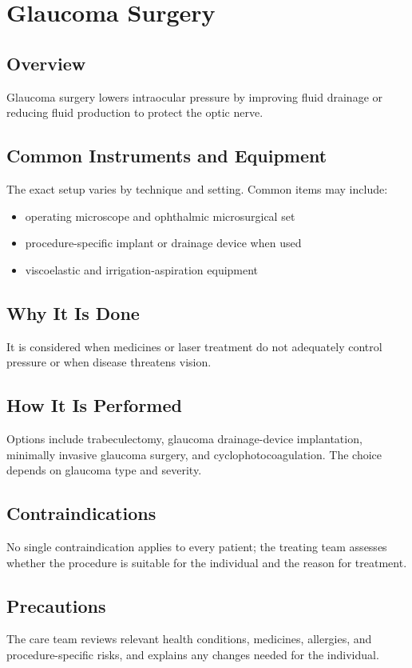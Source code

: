 \chapter{Glaucoma Surgery}
\section*{Overview}
Glaucoma surgery lowers intraocular pressure by improving fluid drainage or reducing fluid production to protect the optic nerve.
\section*{Common Instruments and Equipment}
The exact setup varies by technique and setting. Common items may include:
\begin{itemize}[nosep,leftmargin=*]
  \item operating microscope and ophthalmic microsurgical set
  \item procedure-specific implant or drainage device when used
  \item viscoelastic and irrigation-aspiration equipment
\end{itemize}

\section*{Why It Is Done}
It is considered when medicines or laser treatment do not adequately control pressure or when disease threatens vision.
\section*{How It Is Performed}
Options include trabeculectomy, glaucoma drainage-device implantation, minimally invasive glaucoma surgery, and cyclophotocoagulation. The choice depends on glaucoma type and severity.
\section*{Contraindications}
No single contraindication applies to every patient; the treating team assesses whether the procedure is suitable for the individual and the reason for treatment.

\section*{Precautions}
The care team reviews relevant health conditions, medicines, allergies, and procedure-specific risks, and explains any changes needed for the individual.

